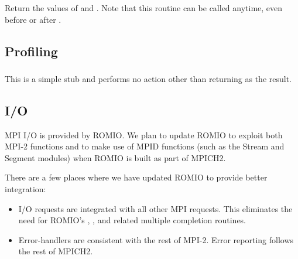 \documentclass{article}
\begin{document}
\subsubsection{}
Return the values of  and . 
Note that this routine can be called anytime, even before  or
after .

\subsection{Profiling}
\label{sec:profile}

\subsubsection{}
This is a simple stub and performs no action other than returning
 as the result.  

\subsection{I/O}
\label{sec:io}
MPI I/O is provided by ROMIO.  We plan to update ROMIO to exploit both
MPI-2 functions and to make use of MPID functions (such as the Stream and
Segment modules) when ROMIO is built as part of MPICH2.

There are a few places where we have updated ROMIO to provide better
integration: 
\begin{itemize}
\item I/O requests are integrated with all other MPI requests.  This
  eliminates the need for ROMIO's , ,
  and related multiple completion routines.
\item Error-handlers are consistent with the rest of MPI-2.
  Error reporting follows the rest of MPICH2.
\end{itemize}
\end{document}
